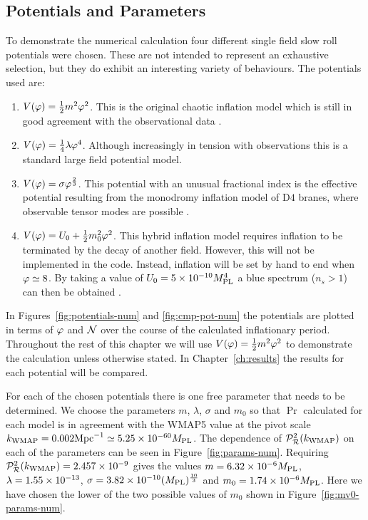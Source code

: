 \subsection{Potentials and Parameters}
\label{sec:pots-num}
To demonstrate the numerical calculation four different single field slow roll
potentials were chosen. These are not intended to represent an exhaustive selection,
but they do exhibit an interesting variety of behaviours. The potentials used are:
% 
% 
\begin{enumerate}
% 
 \item $V(\varphi) = \frac{1}{2} m^2 \varphi^2$. This is the original chaotic inflation model which is
still in good agreement with the observational data \cite{Alabidi:2008ej}.
% 
 \item $V(\varphi) = \frac{1}{4}\lambda\varphi^4$. Although increasingly in tension with observations
 this is a standard large field potential model.
% 
 \item $V(\varphi) = \sigma\varphi^{\frac{2}{3}}$. This potential with an unusual fractional index
is the effective potential resulting from the monodromy inflation model of D$4$
branes, where observable tensor modes are possible \cite{Silverstein:2008sg,
Alabidi:2008ej}.
% 
 \item $V(\varphi) = U_0 + \frac{1}{2} m_0^2 \varphi^2$. This hybrid inflation model requires inflation to
be terminated by the decay of another field. However, this will not be
implemented in the code. Instead,
inflation will be set by hand to end when $\varphi \simeq 8$. By taking a value of
$U_0 = 5\times 10^{-10}M_{\mathrm{PL}}^{4}$ a blue spectrum ($n_s>1$) can then be obtained
\cite{Linde:1993cn,Komatsu:2008hk}.
% 
\end{enumerate}
% 
% 
In Figures~\ref{fig:potentials-num} and \ref{fig:cmp-pot-num} the potentials are
plotted in terms of $\varphi$ and $\mathcal{N}$ over the course of the calculated inflationary
period. Throughout the rest of this chapter we will use $V(\varphi)=\frac{1}{2} m^2 \varphi^2$ to
demonstrate the calculation unless otherwise stated. In Chapter~\ref{ch:results} the
results for each potential will be compared.

For each of the chosen potentials there is one free parameter that needs to be
determined.
We choose the parameters $m$, $\lambda$, $\sigma$ and $m_0$ so that $\Pr$ calculated
for each model is in agreement with the
WMAP5 value at the pivot scale
$k_\mathrm{WMAP}=0.002\mathrm{Mpc}^{-1} \simeq5.25\times10^{- 60} M_{\mathrm{PL}}$. 
The dependence of $\mathcal{P}_{\mathcal{R}}^2 (k_\mathrm{WMAP})$ on each of the parameters can be seen in
Figure~\ref{fig:params-num}.
Requiring $\mathcal{P}_{\mathcal{R}}^2 (k_\mathrm{WMAP})=2.457\times 10^{-9}$
gives the values $m=6.32\times 10^{-6}M_{\mathrm{PL}}$, $\lambda=1.55\times 10^{-13}$, $\sigma= 3.82\times 10^{-10}
(M_{\mathrm{PL}})^{\frac{10}{3}}$ and $m_0=1.74\times 10^{-6}M_{\mathrm{PL}}$. Here we have chosen the lower of
the two possible values of $m_0$ shown in Figure~\ref{fig:mv0-params-num}.

